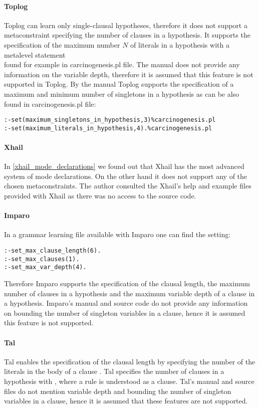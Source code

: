 \paragraph{Toplog}
Toplog can learn only single-clausal hypotheses\cite{muggleton2012mc}, therefore it does not support a metaconstraint specifying the number of clauses in a hypothesis. It supports the specification of the maximum number $N$ of literals in a hypothesis with a metalevel statement\\
 found for example in carcinogenesis.pl file\cite{santos2008toplogWebsite}. The manual does not provide any information on the variable depth, therefore it is assumed that this feature is not supported in Toplog.
By the manual Toplog supports the specification of a maximum and minimum number of singletons in a hypothesis as can be also found in carcinogenesis.pl file:
\begin{lstlisting}
:-set(maximum_singletons_in_hypothesis,3)%carcinogenesis.pl
:-set(maximum_literals_in_hypothesis,4).%carcinogenesis.pl
\end{lstlisting}

\paragraph{Xhail}
In \ref{xhail_mode_declarations} we found out that Xhail has the most advanced system of mode declarations. On the other hand it does not support any of the chosen metaconstraints\cite{ray2007xhail}. The author consulted the Xhail's help and example files provided with Xhail as there was no access to the source code.

\paragraph{Imparo}
In a grammar learning file available with Imparo\cite{kimber2013imparo} one can find the setting:
\begin{lstlisting}
:-set_max_clause_length(6).
:-set_max_clauses(1).
:-set_max_var_depth(4).
\end{lstlisting}
Therefore Imparo supports the specification of the clausal length, the maximum number of clauses in a hypothesis and the maximum variable depth of a clause in a hypothesis. Imparo's manual and source code do not provide any information on bounding the number of singleton variables in a clause, hence it is assumed this feature is not supported.

\paragraph{Tal}
Tal enables the specification of the clausal length by specifying the number of the literals in the body of a clause \cite{corapi2010inductive}. Tal specifies the number of clauses in a hypothesis with \cite{corapi2010inductive}, where a rule is understood as a clause. Tal's manual and source files do not mention variable depth and bounding the number of singleton variables in a clause, hence it is assumed that these features are not supported.

